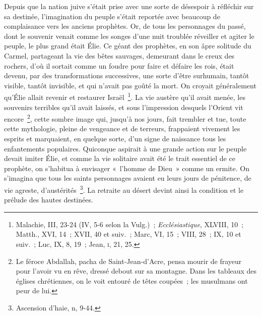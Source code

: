 \documentclass[french,twoside]{book} %
\begin{document}
Depuis que la nation juive s’était prise avec une sorte de désespoir à réfléchir sur sa destinée, l’imagination du peuple s’était reportée avec beaucoup de complaisance vers les anciens prophètes. Or, de tous les personnages du passé, dont le souvenir venait comme les songes d’une nuit troublée réveiller et agiter le peuple, le plus grand était Élie. Ce géant des prophètes, en son âpre solitude du Carmel, partageant la vie des bêtes sauvages, demeurant dans le creux des rochers, d’où il sortait comme un foudre pour faire et défaire les rois, était devenu, par des transformations successives, une sorte d’être surhumain, tantôt visible, tantôt invisible, et qui n’avait pas goûté la mort. On croyait généralement qu’Élie allait revenir et restaurer Israël \footnote{ Malachie, III, 23-24 (IV, 5-6 selon la Vulg.) ; {\itshape Ecclésiastique}, XLVIII, 10 ; Matth., XVI, 14 ; XVII, 40 et suiv. ; Marc, VI, 15 ; VIII, 28 ; IX, 10 et suiv. ; Luc, IX, 8, 19 ; Jean, \textsc{i}, 21, 25.}. La vie austère qu’il avait menée, les souvenirs terribles qu’il avait laissés, et sous l’impression desquels l’Orient vit encore \footnote{Le féroce Abdallah, pacha de Saint-Jean-d’Acre, pensa mourir de frayeur pour l’avoir vu en rêve, dressé debout sur sa montagne. Dans les tableaux des églises chrétiennes, on le voit entouré de têtes coupées ; les musulmans ont peur de lui.}, cette sombre image qui, jusqu’à nos jours, fait trembler et tue, toute cette mythologie, pleine de vengeance et de terreurs, frappaient vivement les esprits et marquaient, en quelque sorte, d’un signe de naissance tous les enfantements populaires. Quiconque aspirait à une grande action sur le peuple devait imiter Élie, et comme la vie solitaire avait été le trait essentiel de ce prophète, on s’habitua à envisager « l’homme de Dieu » comme un ermite. On s’imagina que tous les saints personnages avaient eu leurs jours de pénitence, de vie agreste, d’austérités \footnote{Ascension d’haie, n, 9-44.}. La retraite au désert devint ainsi la condition et le prélude des hautes destinées.\par
\end{document}
